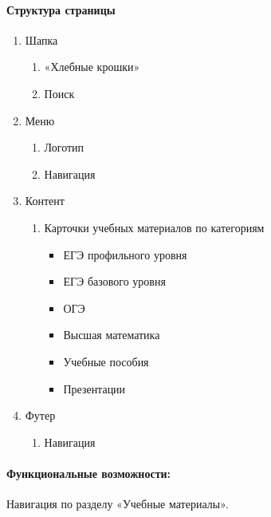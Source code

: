 \paragraph{Структура страницы}
\begin{enumerate}
	\item Шапка
	\begin{enumerate}
		\item «Хлебные крошки»
		\item Поиск
	\end{enumerate}

	\item Меню
	\begin{enumerate}
		\item Логотип
		\item Навигация
	\end{enumerate}

	\item Контент
	\begin{enumerate}
		\item Карточки учебных материалов по категориям
		\begin{itemize}
			\item ЕГЭ профильного уровня
			\item ЕГЭ базового уровня
			\item ОГЭ
			\item Высшая математика
			\item Учебные пособия
			\item Презентации
		\end{itemize}
	\end{enumerate}

	\item Футер
	\begin{enumerate}
		\item Навигация
	\end{enumerate}
\end{enumerate}

\paragraph{Функциональные возможности:} Навигация по разделу «Учебные материалы».
